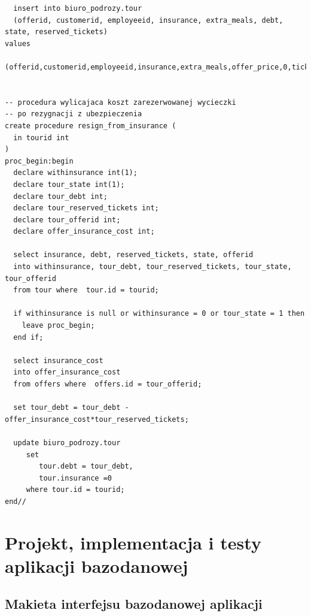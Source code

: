\documentclass[polish,polish,a4paper]{article}
\begin{document}
\begin{lstlisting}
  insert into biuro_podrozy.tour
  (offerid, customerid, employeeid, insurance, extra_meals, debt, state, reserved_tickets)
values
  (offerid,customerid,employeeid,insurance,extra_meals,offer_price,0,ticket_count);


-- procedura wylicajaca koszt zarezerwowanej wycieczki
-- po rezygnacji z ubezpieczenia
create procedure resign_from_insurance (
  in tourid int
)
proc_begin:begin
  declare withinsurance int(1);
  declare tour_state int(1);
  declare tour_debt int;
  declare tour_reserved_tickets int;
  declare tour_offerid int;
  declare offer_insurance_cost int;

  select insurance, debt, reserved_tickets, state, offerid
  into withinsurance, tour_debt, tour_reserved_tickets, tour_state, tour_offerid
  from tour where  tour.id = tourid;

  if withinsurance is null or withinsurance = 0 or tour_state = 1 then
    leave proc_begin;
  end if;

  select insurance_cost
  into offer_insurance_cost
  from offers where  offers.id = tour_offerid;

  set tour_debt = tour_debt -  offer_insurance_cost*tour_reserved_tickets;

  update biuro_podrozy.tour
     set
        tour.debt = tour_debt,
        tour.insurance =0
     where tour.id = tourid;
end//
\end{lstlisting}
\section{Projekt, implementacja i testy aplikacji bazodanowej}
\subsection{Makieta interfejsu bazodanowej aplikacji}



\end{document}
